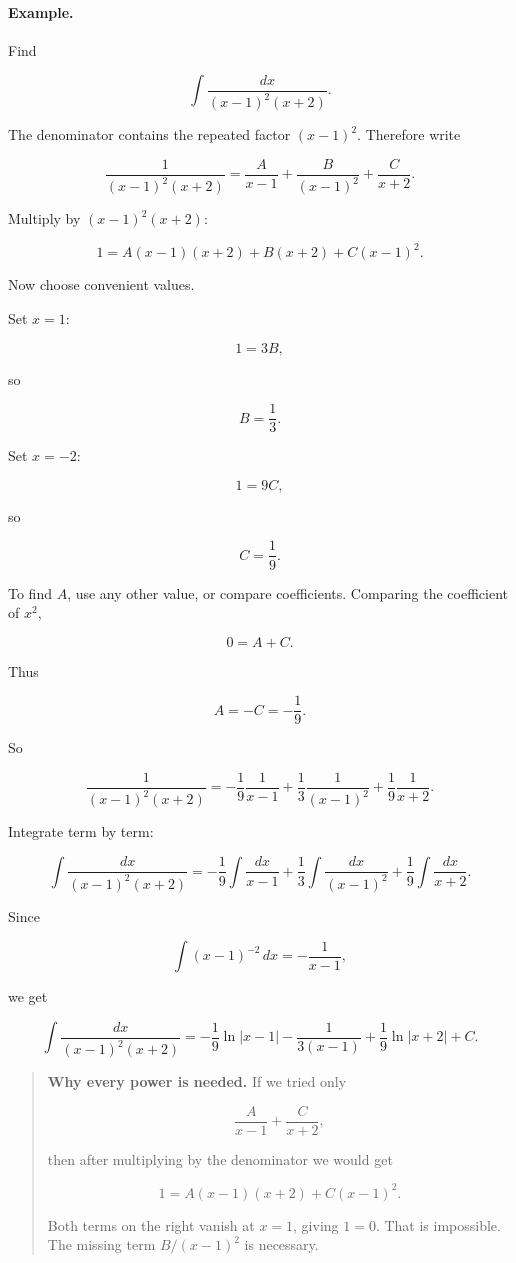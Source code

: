 \paragraph{Example.}
Find

\[
\int \frac{dx}{(x-1)^2(x+2)}.
\]

The denominator contains the repeated factor \((x-1)^2\).  Therefore write

\[
\frac{1}{(x-1)^2(x+2)}
=
\frac{A}{x-1}
+
\frac{B}{(x-1)^2}
+
\frac{C}{x+2}.
\]

Multiply by \((x-1)^2(x+2)\):

\[
1=A(x-1)(x+2)+B(x+2)+C(x-1)^2.
\]

Now choose convenient values.

Set \(x=1\):

\[
1=3B,
\]

so

\[
B=\frac13.
\]

Set \(x=-2\):

\[
1=9C,
\]

so

\[
C=\frac19.
\]

To find \(A\), use any other value, or compare coefficients.  Comparing the coefficient
of \(x^2\),

\[
0=A+C.
\]

Thus

\[
A=-C=-\frac19.
\]

So

\[
\frac{1}{(x-1)^2(x+2)}
=
-\frac{1}{9}\frac{1}{x-1}
+
\frac{1}{3}\frac{1}{(x-1)^2}
+
\frac{1}{9}\frac{1}{x+2}.
\]

Integrate term by term:

\[
\int \frac{dx}{(x-1)^2(x+2)}
=
-\frac19\int\frac{dx}{x-1}
+
\frac13\int\frac{dx}{(x-1)^2}
+
\frac19\int\frac{dx}{x+2}.
\]

Since

\[
\int (x-1)^{-2}\,dx
=
-\frac{1}{x-1},
\]

we get

\[
\boxed{
\int \frac{dx}{(x-1)^2(x+2)}
=
-\frac19\ln|x-1|
-
\frac{1}{3(x-1)}
+
\frac19\ln|x+2|
+C.
}
\]

\begin{quote}
\textbf{Why every power is needed.}
If we tried only

\[
\frac{A}{x-1}+\frac{C}{x+2},
\]

then after multiplying by the denominator we would get

\[
1=A(x-1)(x+2)+C(x-1)^2.
\]

Both terms on the right vanish at \(x=1\), giving \(1=0\).  That is impossible.  The
missing term \(B/(x-1)^2\) is necessary.
\end{quote}

